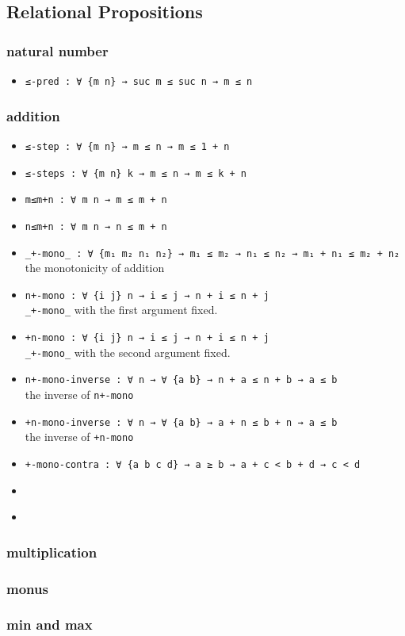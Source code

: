 \documentclass[../thesis.tex]{subfiles}
\begin{document}
\subsection{Relational Propositions}

\subsubsection{natural number}

\begin{itemize}
    \item {\lstinline|≤-pred : ∀ {m n} → suc m ≤ suc n → m ≤ n|}
\end{itemize}

\subsubsection{addition}

\begin{itemize}
    \item {\lstinline|≤-step : ∀ {m n} → m ≤ n → m ≤ 1 + n|}
    \item {\lstinline|≤-steps : ∀ {m n} k → m ≤ n → m ≤ k + n|}
    \item {\lstinline|m≤m+n : ∀ m n → m ≤ m + n|}
    \item {\lstinline|n≤m+n : ∀ m n → n ≤ m + n|}
    \item {\lstinline|_+-mono_ : ∀ {m₁ m₂ n₁ n₂} → m₁ ≤ m₂ → n₁ ≤ n₂ → m₁ + n₁ ≤ m₂ + n₂|}
        \\ the monotonicity of addition
    \item {\lstinline|n+-mono : ∀ {i j} n → i ≤ j → n + i ≤ n + j|}
        \\ {\lstinline|_+-mono_|} with the first argument fixed.
    \item {\lstinline|+n-mono : ∀ {i j} n → i ≤ j → n + i ≤ n + j|}
        \\ {\lstinline|_+-mono_|} with the second argument fixed.
    \item {\lstinline|n+-mono-inverse : ∀ n → ∀ {a b} → n + a ≤ n + b → a ≤ b|}
        \\ the inverse of {\lstinline|n+-mono|}
    \item {\lstinline|+n-mono-inverse : ∀ n → ∀ {a b} → a + n ≤ b + n → a ≤ b|}
        \\ the inverse of {\lstinline|+n-mono|}
    \item {\lstinline|+-mono-contra : ∀ {a b c d} → a ≥ b → a + c < b + d → c < d|}
    \item {\lstinline||}
    \item {\lstinline||}
\end{itemize}
\subsubsection{multiplication}
\subsubsection{monus}
\subsubsection{min and max}
\end{document}
